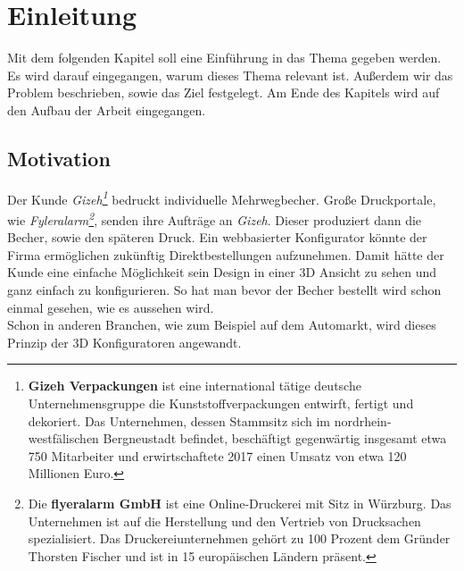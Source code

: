 %
%
%
%
\chapter{Einleitung}
\label{cha:introduction}
%
%
Mit dem folgenden Kapitel soll eine Einführung in das Thema gegeben werden. Es wird darauf eingegangen, warum dieses Thema relevant ist. Außerdem wir das Problem beschrieben, sowie das Ziel festgelegt. Am Ende des Kapitels wird auf den Aufbau der Arbeit eingegangen.
%
%
%
%
%
\section{Motivation}
\label{sec:motivation}
%
Der Kunde \textit{Gizeh\footnote{\textbf{Gizeh Verpackungen} ist eine international tätige deutsche Unternehmensgruppe die Kunststoffverpackungen entwirft, fertigt und dekoriert. Das Unternehmen, dessen Stammsitz sich im nordrhein-westfälischen Bergneustadt befindet, beschäftigt gegenwärtig insgesamt etwa 750 Mitarbeiter und erwirtschaftete 2017 einen Umsatz von etwa 120 Millionen Euro.}} bedruckt individuelle Mehrwegbecher. Große Druckportale, wie \textit{Fyleralarm\footnote{Die \textbf{flyeralarm GmbH} ist eine Online-Druckerei mit Sitz in Würzburg. Das Unternehmen ist auf die Herstellung und den Vertrieb von Drucksachen spezialisiert. Das Druckereiunternehmen gehört zu 100 Prozent dem Gründer Thorsten Fischer und ist in 15 europäischen Ländern präsent.}}, senden ihre Aufträge an \textit{Gizeh}. Dieser produziert dann die Becher, sowie den späteren Druck. Ein webbasierter Konfigurator könnte der Firma ermöglichen zukünftig Direktbestellungen aufzunehmen. Damit hätte der Kunde eine einfache Möglichkeit sein Design in einer 3D Ansicht zu sehen und ganz einfach zu konfigurieren. So hat man bevor der Becher bestellt wird schon einmal gesehen, wie es aussehen wird. \\
Schon in anderen Branchen, wie zum Beispiel auf dem Automarkt, wird dieses Prinzip der 3D Konfiguratoren angewandt. 
%
%
%
%
%

